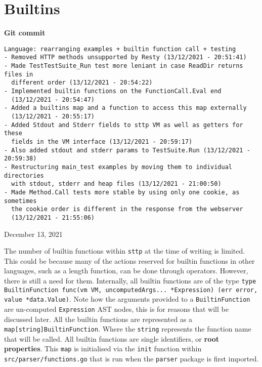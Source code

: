 \section{Builtins}
\label{sec:development-builtins}

\begin{center}
    \textbf{Git commit}
    \begin{verbatim}
Language: rearranging examples + builtin function call + testing
- Removed HTTP methods unsupported by Resty (13/12/2021 - 20:51:41)
- Made TestTestSuite_Run test more leniant in case ReadDir returns files in
  different order (13/12/2021 - 20:54:22)
- Implemented builtin functions on the FunctionCall.Eval end
  (13/12/2021 - 20:54:47)
- Added a builtins map and a function to access this map externally
  (13/12/2021 - 20:55:17)
- Added Stdout and Stderr fields to sttp VM as well as getters for these
  fields in the VM interface (13/12/2021 - 20:59:17)
- Also added stdout and stderr params to TestSuite.Run (13/12/2021 - 20:59:38)
- Restructuring main_test examples by moving them to individual directories
  with stdout, stderr and heap files (13/12/2021 - 21:00:50)
- Made Method.Call tests more stable by using only one cookie, as sometimes
  the cookie order is different in the response from the webserver
  (13/12/2021 - 21:55:06)
    \end{verbatim}
    \vspace{-1em}
    \tiny{December 13, 2021}
\end{center}

The number of builtin functions within \verb|sttp| at the time of writing is limited. This could be because many of the actions reserved for builtin functions in other languages, such as a length function, can be done through operators. However, there is still a need for them. Internally, all builtin functions are of the type \texttt{type BuiltinFunction func(vm VM, uncomputedArgs... *Expression) (err error, value *data.Value)}. Note how the arguments provided to a \verb|BuiltinFunction| are un-computed \verb|Expression| AST nodes, this is for reasons that will be discussed later. All the builtin functions are represented as a \texttt{map[string]BuiltinFunction}. Where the \texttt{string} represents the function name that will be called. All builtin functions are single identifiers, or \textbf{root properties}. This \texttt{map} is initialised via the \verb|init| function within \verb|src/parser/functions.go| that is run when the \verb|parser| package is first imported.


